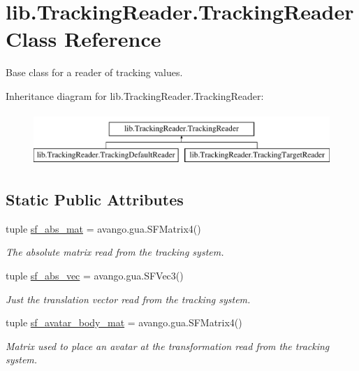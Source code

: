 \hypertarget{classlib_1_1TrackingReader_1_1TrackingReader}{\section{lib.\-Tracking\-Reader.\-Tracking\-Reader \-Class \-Reference}
\label{classlib_1_1TrackingReader_1_1TrackingReader}
}


\-Base class for a reader of tracking values.  


\-Inheritance diagram for lib.\-Tracking\-Reader.\-Tracking\-Reader\-:\begin{figure}[H]
\begin{center}
\leavevmode
\includegraphics[height=2.000000cm]{classlib_1_1TrackingReader_1_1TrackingReader}
\end{center}
\end{figure}
\subsection*{\-Static \-Public \-Attributes}
\begin{DoxyCompactItemize}
\item 
tuple \hyperlink{classlib_1_1TrackingReader_1_1TrackingReader_a0b69c7b53e8e4bf20f513969c7709983}{sf\-\_\-abs\-\_\-mat} = avango.\-gua.\-S\-F\-Matrix4()
\begin{DoxyCompactList}\small\item\em \-The absolute matrix read from the tracking system. \end{DoxyCompactList}\item 
tuple \hyperlink{classlib_1_1TrackingReader_1_1TrackingReader_a8e13d83efc26c34d0bcdc0218f466bce}{sf\-\_\-abs\-\_\-vec} = avango.\-gua.\-S\-F\-Vec3()
\begin{DoxyCompactList}\small\item\em \-Just the translation vector read from the tracking system. \end{DoxyCompactList}\item 
tuple \hyperlink{classlib_1_1TrackingReader_1_1TrackingReader_a9e0431893dd2af4d1a9da802b1f4bdaa}{sf\-\_\-avatar\-\_\-body\-\_\-mat} = avango.\-gua.\-S\-F\-Matrix4()
\begin{DoxyCompactList}\small\item\em \-Matrix used to place an avatar at the transformation read from the tracking system. \end{DoxyCompactList}\end{DoxyCompactItemize}


